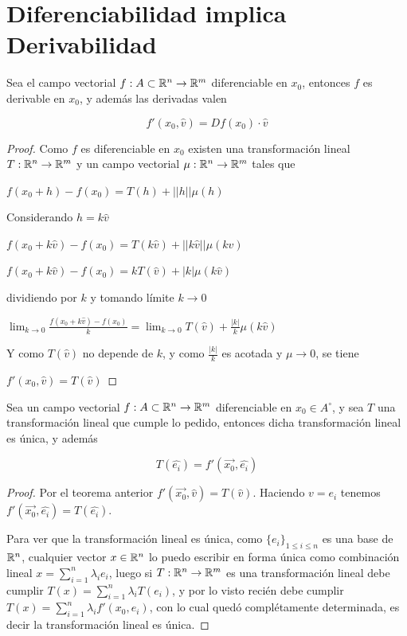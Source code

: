 \section{Diferenciabilidad implica Derivabilidad}

\begin{theorem} \label{difderiv}
Sea el campo vectorial $ f : A \subset \mathbb{R}^n \to \mathbb{R}^m$ diferenciable en $ x_0 $, entonces $f$ es derivable en $x_0$, y además las derivadas valen 

$$ f'(x_0, \hat{v}) = D f(x_0) \cdot \hat{v}$$
\end{theorem}

\begin{proof}
Como $f$ es diferenciable en $x_0$ existen una transformación lineal $T : \mathbb{R}^n \to \mathbb{R}^m$ y un campo vectorial $ \mu : \mathbb{R}^n \to \mathbb{R}^m$ tales que

$ \displaystyle f(x_0 + h) - f(x_0) = T(h) + ||h|| \mu(h)$

Considerando $ h = k\hat{v}$

$ \displaystyle f(x_0 + k\hat{v}) - f(x_0) = T(k\hat{v}) + ||k \hat{v}|| \mu(k\hat{v})$

$ \displaystyle f(x_0 + k\hat{v}) - f(x_0) = k T(\hat{v}) + |k| \mu(k\hat{v})$

dividiendo por $k$ y tomando límite $ k \to 0 $

$ \displaystyle \lim_{k \to 0} \frac{f(x_0 + k\hat{v}) - f(x_0)}{k} = \lim_{k \to 0} T(\hat{v}) + \frac{|k|}{k} \mu(k \hat{v})$

Y como $T(\hat{v})$ no depende de $k$, y como $\frac{|k|}{k}$ es acotada y $\mu \to 0$, se tiene

$ \displaystyle f'(x_0, \hat{v}) = T(\hat{v}) $
\end{proof}

\begin{corollary}
Sea un campo vectorial $ f : A \subset \mathbb{R}^n \to \mathbb{R}^m$ diferenciable en $x_0 \in A^{\circ}$, y sea $T$ una transformación lineal que cumple lo pedido, entonces dicha transformación lineal es única, y además 

$$ T(\hat{e_i}) = f'(\vec{x_0}, \hat{e_i})$$  
\end{corollary}

\begin{proof}
Por el teorema anterior $ f'(\vec{x_0}, \hat{v}) = T(\hat{v}) $.  Haciendo $ v = e_i$ tenemos $ f'(\vec{x_0}, \hat{e_i}) = T(\hat{e_i}) $.  

Para ver que la transformación lineal es única, como $\{e_i\}_{1 \leq i \leq n}$ es una base de $\mathbb{R}^n$, cualquier vector $x \in \mathbb{R}^n$ lo puedo escribir en forma única como combinación lineal $x = \sum_{i=1}^n \lambda_i e_i$, luego si $T : \mathbb{R}^n \to \mathbb{R}^m$ es una transformación lineal debe cumplir $T(x) = \sum_{i=1}^n \lambda_i T(e_i)$, y por lo visto recién debe cumplir  $T(x) = \sum_{i=1}^n \lambda_i f'(x_0, e_i)$, con lo cual quedó complétamente determinada, es decir la transformación lineal es única.
\end{proof}

